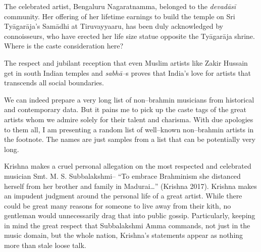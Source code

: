 The celebrated artist, Bengaluru Nagaratnamma, belonged to the \textit{devadāsī} community. Her offering of her lifetime earnings to build the temple on Sri Tyāgarāja’s Samādhi at Tiruvayyaaru, has been duly acknowledged by connoisseurs, who have erected her life size statue opposite the Tyāgarāja shrine. Where is the caste consideration here?

The respect and jubilant reception that even Muslim artists like Zakir Hussain get in south Indian temples and \textit{sabhā–}s proves that India’s love for artists that transcends all social boundaries.

We can indeed prepare a very long list of non–brahmin musicians from historical and contemporary data. But it pains me to pick up the caste tags of the great artists whom we admire solely for their talent and charisma. With due apologies to them all, I am presenting a random list of well–known non–brahmin artists in the footnote.  The names are just samples from a list that can be potentially very long.

Krishna makes a cruel personal allegation on the most respected and celebrated musician Smt. M. S. Subbalakshmi– “To embrace Brahminism she distanced herself from her brother and family in Madurai…” (Krishna 2017). Krishna makes an impudent judgment around the personal life of a great artist. While there could be great many reasons for someone to live away from their kith, no gentleman would unnecessarily drag that into public gossip. Particularly, keeping in mind the great respect that Subbalakshmi Amma commands, not just in the music domain, but the whole nation, Krishna’s statements appear as nothing more than stale loose talk.

